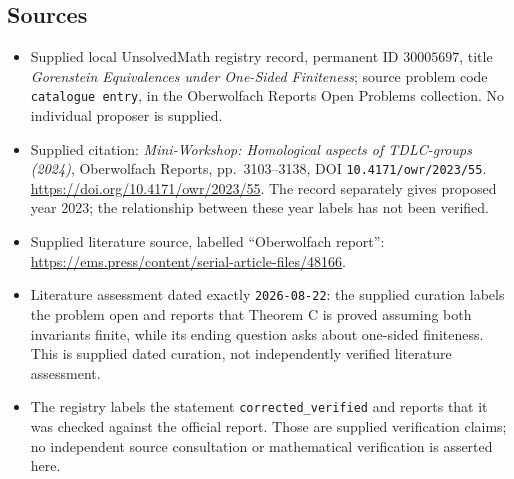 \documentclass[11pt]{article}
\begin{document}
\subsection{Sources}
\begin{itemize}
\item Supplied local UnsolvedMath registry record, permanent ID \(30005697\), title \emph{Gorenstein Equivalences under One-Sided Finiteness}; source problem code \texttt{catalogue entry}, in the Oberwolfach Reports Open Problems collection. No individual proposer is supplied.
\item Supplied citation: \emph{Mini-Workshop: Homological aspects of TDLC-groups (2024)}, Oberwolfach Reports, pp.~3103--3138, DOI \texttt{10.4171/owr/2023/55}. \url{https://doi.org/10.4171/owr/2023/55}. The record separately gives proposed year 2023; the relationship between these year labels has not been verified.
\item Supplied literature source, labelled ``Oberwolfach report'': \url{https://ems.press/content/serial-article-files/48166}.
\item Literature assessment dated exactly \texttt{2026-08-22}: the supplied curation labels the problem open and reports that Theorem C is proved assuming both invariants finite, while its ending question asks about one-sided finiteness. This is supplied dated curation, not independently verified literature assessment.
\item The registry labels the statement \texttt{corrected\_verified} and reports that it was checked against the official report. Those are supplied verification claims; no independent source consultation or mathematical verification is asserted here.
\end{itemize}
\end{document}
